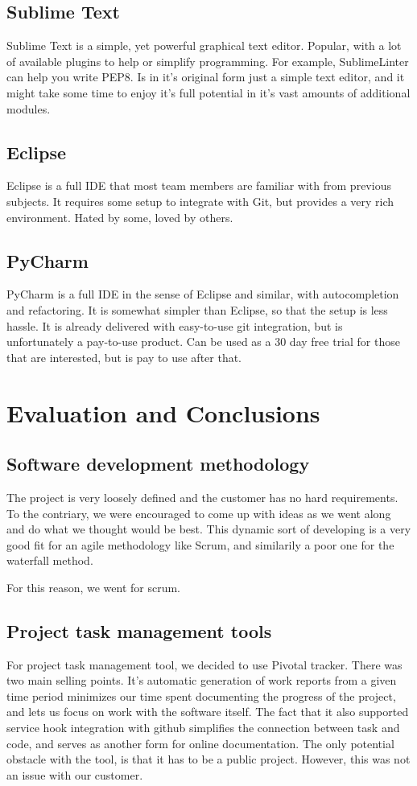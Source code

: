 \documentclass{report}
\begin{document}
\subsection{Sublime Text}
Sublime Text\cite{website:sublime_text} is a simple, yet powerful graphical text editor. Popular, with a lot of available plugins to help or simplify programming. For example, SublimeLinter can help you write PEP8. Is in it’s original form just a simple text editor, and it might take some time to enjoy it’s full potential in it’s vast amounts of additional modules. 

\subsection{Eclipse}
Eclipse\cite{website:eclipse} is a full IDE that most team members are familiar with from previous subjects. It requires some setup to integrate with Git, but provides a very rich environment. Hated by some, loved by others. 

\subsection{PyCharm}
PyCharm\cite{website:pycharm} is a full IDE in the sense of Eclipse and similar, with autocompletion and refactoring. It is somewhat simpler than Eclipse, so that the setup is less hassle. It is already delivered with easy-to-use git integration, but is unfortunately a pay-to-use product. Can be used as a 30 day free trial for those that are interested, but is pay to use after that.

\newpage
\section{Evaluation and Conclusions}
\subsection{Software development methodology}
The project is very loosely defined and the customer has no hard requirements. To the contriary, we were encouraged to come up with ideas as we went along and do what we thought would be best. This dynamic sort of developing is a very good fit for an agile methodology like Scrum, and similarily a poor one for the waterfall method.

For this reason, we went for scrum.

\subsection{Project task management tools}
For project task management tool, we decided to use Pivotal tracker. There was two main selling points. It’s automatic generation of work reports from a given time period minimizes our time spent documenting the progress of the project, and lets us focus on work with the software itself. The fact that it also supported service hook integration with github simplifies the connection between task and code, and serves as another form for online documentation.
The only potential obstacle with the tool, is that it has to be a public project. However, this was not an issue with our customer.
\end{document}
